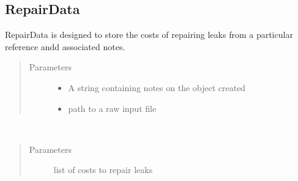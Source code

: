 \documentclass[letterpaper,10pt,english]{sphinxmanual}
\begin{document}
\subsection{RepairData}
\label{\detokenize{index:repairdata}}

\begin{fulllineitems}
\label{\detokenize{index:feast.input_data_classes.RepairData}}
RepairData is designed to store the costs of repairing leaks from a particular reference andd associated notes.
\begin{quote}\begin{description}
\item[{Parameters}] \leavevmode\begin{itemize}
\item {} 
 \textendash{} A string containing notes on the object created

\item {} 
 \textendash{} path to a raw input file

\end{itemize}

\end{description}\end{quote}

\begin{fulllineitems}
\label{\detokenize{index:feast.input_data_classes.RepairData.define_data}}~\begin{quote}\begin{description}
\item[{Parameters}] \leavevmode
{} \textendash{} list of costs to repair leaks

\end{description}\end{quote}

\end{fulllineitems}


\end{fulllineitems}
\end{document}
